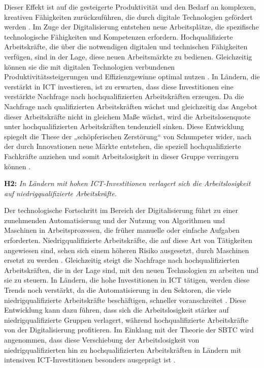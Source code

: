 Dieser Effekt ist auf die gesteigerte Produktivität und den Bedarf an komplexen, kreativen 
Fähigkeiten zurückzuführen, die durch digitale Technologien gefördert werden 
\parencite[vgl.][S. 5–8]{acemoglu2002technical}. Im Zuge der Digitalisierung entstehen neue 
Arbeitsplätze, die spezifische technologische Fähigkeiten und Kompetenzen erfordern. 
Hochqualifizierte Arbeitskräfte, die über die notwendigen digitalen und technischen 
Fähigkeiten verfügen, sind in der Lage, diese neuen Arbeitsmärkte zu bedienen. Gleichzeitig 
können sie die mit digitalen Technologien verbundenen Produktivitätssteigerungen und 
Effizienzgewinne optimal nutzen \parencite[vgl.][Kap. 2]{brynjolfsson2014thesecond}. In 
Ländern, die verstärkt in \ac{ICT} investieren, ist zu erwarten, dass diese Investitionen 
eine verstärkte Nachfrage nach hochqualifizierten Arbeitskräften erzeugen. Da die Nachfrage 
nach qualifizierten Arbeitskräften wächst und gleichzeitig das Angebot dieser Arbeitskräfte 
nicht in gleichem Maße wächst, wird die Arbeitslosenquote unter hochqualifizierten 
Arbeitskräften tendenziell sinken. Diese Entwicklung spiegelt die These der „schöpferischen 
Zerstörung“ von Schumpeter wider, nach der durch Innovationen neue Märkte entstehen, die 
speziell hochqualifizierte Fachkräfte anziehen und somit Arbeitslosigkeit in dieser Gruppe 
verringern können \parencite[vgl.][S. 103–106]{schumpeter1976capitalism}.

\textbf{H2:} \textit{In Ländern mit hohen \ac{ICT}-Investitionen verlagert sich die Arbeitslosigkeit 
auf niedrigqualifizierte Arbeitskräfte.}

Der technologische Fortschritt im Bereich der Digitalisierung führt zu einer zunehmenden 
Automatisierung und der Nutzung von Algorithmen und Maschinen in Arbeitsprozessen, die 
früher manuelle oder einfache Aufgaben erforderten. Niedrigqualifizierte Arbeitskräfte, die 
auf diese Art von Tätigkeiten angewiesen sind, sehen sich einem höheren Risiko ausgesetzt, 
durch Maschinen ersetzt zu werden \parencite[vgl.][S. 5–10]{autor2015whyare}. Gleichzeitig 
steigt die Nachfrage nach hochqualifizierten Arbeitskräften, die in der Lage sind, mit den 
neuen Technologien zu arbeiten und sie zu steuern. In Ländern, die hohe Investitionen in 
\ac{ICT} tätigen, werden diese Trends noch verstärkt, da die Automatisierung in den 
Sektoren, die viele niedrigqualifizierte Arbeitskräfte beschäftigen, schneller 
voranschreitet \parencite[vgl.][S. 254]{frey2013thefuture}. Diese Entwicklung kann dazu 
führen, dass sich die Arbeitslosigkeit stärker auf niedrigqualifizierte Gruppen verlagert, 
während hochqualifizierte Arbeitskräfte von der Digitalisierung profitieren. Im Einklang 
mit der Theorie der \ac{SBTC} wird angenommen, dass diese Verschiebung der Arbeitslosigkeit 
von niedrigqualifizierten hin zu hochqualifizierten Arbeitskräften in Ländern mit 
intensiven \ac{ICT}-Investitionen besonders ausgeprägt ist 
\parencite[vgl.][S. 3]{acemoglu2019robots}.

